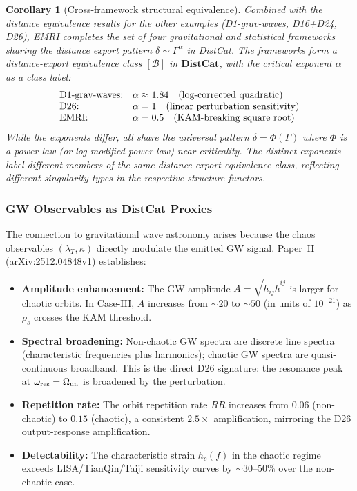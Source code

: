 \documentclass[
]{article}
\newtheorem{corollary}[theorem]{Corollary}
\begin{document}
\begin{corollary}[Cross-framework structural equivalence]\label{cor:cross-framework-emri}
Combined with the distance equivalence results for the other examples (D1-grav-waves, D16+D24, D26), EMRI completes the set of four gravitational and statistical frameworks sharing the distance export pattern $\delta \sim \Gamma^\alpha$ in DistCat. The frameworks form a distance-export equivalence class $[\mathcal{B}]$ in $\mathbf{DistCat}$, with the critical exponent $\alpha$ as a class label:
\begin{equation}
\begin{array}{l@{\quad}l}
\text{D1-grav-waves:} & \alpha \approx 1.84 \quad (\text{log-corrected quadratic}) \\
\text{D26:} & \alpha = 1 \quad (\text{linear perturbation sensitivity}) \\
\text{EMRI:} & \alpha = 0.5 \quad (\text{KAM-breaking square root})
\end{array}
\end{equation}
While the exponents differ, all share the universal pattern $\delta = \Phi(\Gamma)$ where $\Phi$ is a power law (or log-modified power law) near criticality. The distinct exponents label different members of the same distance-export equivalence class, reflecting different singularity types in the respective structure functors.
\end{corollary}

\subsubsection{GW Observables as DistCat Proxies}\label{subsec:gw-observables}

The connection to gravitational wave astronomy arises because the chaos observables $(\lambda_T, \kappa)$ directly modulate the emitted GW signal. Paper~II (arXiv:2512.04848v1) establishes:

\begin{itemize}
\item \textbf{Amplitude enhancement:} The GW amplitude $A = \sqrt{\dot{h}_{ij}\dot{h}^{ij}}$ is larger for chaotic orbits. In Case-III, $A$ increases from $\sim 20$ to $\sim 50$ (in units of $10^{-21}$) as $\rho_s$ crosses the KAM threshold.
\item \textbf{Spectral broadening:} Non-chaotic GW spectra are discrete line spectra (characteristic frequencies plus harmonics); chaotic GW spectra are quasi-continuous broadband. This is the direct D26 signature: the resonance peak at $\omega_{\rm res} = \Omega_{\rm un}$ is broadened by the perturbation.
\item \textbf{Repetition rate:} The orbit repetition rate $RR$ increases from $0.06$ (non-chaotic) to $0.15$ (chaotic), a consistent $2.5\times$ amplification, mirroring the D26 output-response amplification.
\item \textbf{Detectability:} The characteristic strain $h_c(f)$ in the chaotic regime exceeds LISA/TianQin/Taiji sensitivity curves by $\sim 30$--$50\%$ over the non-chaotic case.
\end{itemize}
\end{document}
